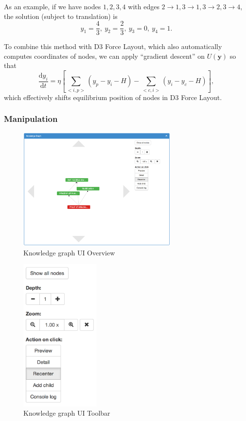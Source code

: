 \documentclass{acm_proc_article-sp}
\begin{document}
As an example, if we have nodes $1,2,3,4$ with edges 
$2 \rightarrow 1, 3 \rightarrow 1, 3 \rightarrow 2, 3 \rightarrow 4$,
the solution (subject to translation) is
$$y_1=\frac43,~y_2=\frac23,~y_3=0,~y_4=1.$$

To combine this method with D3 Force Layout, 
which also automatically computes coordinates of nodes,
we can apply ``gradient descent'' on $U(\mathbf{y})$ so that
\begin{equation}
\frac{\mathrm{d}y_i}{\mathrm{d}t} = \eta
\left[
\sum_{<i,p>}\left(y_p-y_i-H\right)
-\sum_{<c,i>}\left(y_i-y_c-H\right)\right],
\end{equation}
which effectively shifts equilibrium position of nodes in D3 Force Layout.

\subsubsection{Manipulation}
\begin{figure}[h!]
\centering
\includegraphics[width=8cm]{toolbar.png}
\caption{Knowledge graph UI Overview}
\end{figure}
\begin{figure}[h!]
\centering
\includegraphics[width=4cm]{toolbar2.png}
\caption{Knowledge graph UI Toolbar}
\end{figure}
\end{document}

